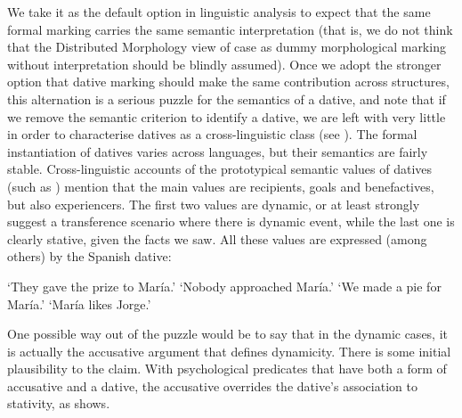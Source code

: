 \documentclass[output=paper,colorlinks,citecolor=brown,nonflat]{langsci/langscibook}
\begin{document}
We take it as the default option in linguistic analysis to expect that the same formal marking carries the same semantic interpretation (that is, we do not think that the Distributed Morphology view of case as dummy morphological marking without interpretation should be blindly assumed). Once we adopt the stronger option that dative marking should make the same contribution across structures, this alternation is a serious puzzle for the semantics of a dative, and note that if we remove the semantic criterion to identify a dative, we are left with very little in order to characterise datives as a cross-linguistic class (see ). The formal instantiation of datives varies across languages, but their semantics are fairly stable. Cross-linguistic accounts of the prototypical semantic values of datives (such as \citealt{Næss2009}) mention that the main values are recipients, goals and benefactives, but also experiencers. The first two values are dynamic, or at least strongly suggest a transference scenario where there is dynamic event, while the last one is clearly stative, given the facts we saw. All these values are expressed (among others) by the Spanish dative:

\ea%
    \label{ex:fabregas:10}
    \glt `They gave the prize to María.'
    \glt `Nobody approached María.'
    \glt `We made a pie for María.'
    \glt `María likes Jorge.'
    \z
\z

One possible way out of the puzzle would be to say that in the dynamic cases, it is actually the accusative argument that defines dynamicity. There is some initial plausibility to the claim. With psychological predicates that have both a form of accusative and a dative, the accusative overrides the dative's association to stativity, as  shows.
\end{document}
